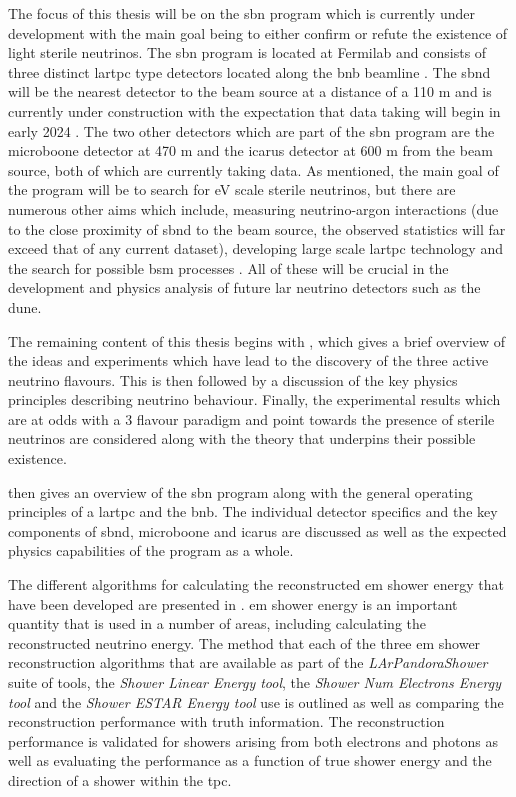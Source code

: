 The focus of this thesis will be on the \gls{sbn} program which is currently under development with the main goal being to either confirm or refute the existence of light sterile neutrinos. The \gls{sbn} program is located at Fermilab and consists of three distinct \gls{lartpc} type detectors located along the \gls{bnb} beamline \cite{SBN_Proposal}. The \gls{sbnd} will be the nearest detector to the beam source at a distance of a 110 m and is currently under construction with the expectation that data taking will begin in early 2024 \cite{sbnd_timeline}. The two other detectors which are part of the \gls{sbn} program are the \gls{microboone} detector at 470 m and the \gls{icarus} detector at 600 m from the beam source, both of which are currently taking data. As mentioned, the main goal of the program will be to search for eV scale sterile neutrinos, but there are numerous other aims which include, measuring neutrino-argon interactions (due to the close proximity of \gls{sbnd} to the beam source, the observed statistics will far exceed that of any current dataset), developing large scale \gls{lartpc} technology and the search for possible \gls{bsm} processes \cite{SBN_paper}. All of these will be crucial in the development and physics analysis of future \gls{lar} neutrino detectors such as the \gls{dune}. 

The remaining content of this thesis begins with , which gives a brief overview of the ideas and experiments which have lead to the discovery of the three active neutrino flavours. This is then followed by a discussion of the key physics principles describing neutrino behaviour. Finally, the experimental results which are at odds with a 3 flavour paradigm and point towards the presence of sterile neutrinos are considered along with the theory that underpins their possible existence. 

 then gives an overview of the \gls{sbn} program along with the general operating principles of a \gls{lartpc} and the \gls{bnb}. The individual detector specifics and the key components of \gls{sbnd}, \gls{microboone} and \gls{icarus} are discussed as well as the expected physics capabilities of the program as a whole. 

The different algorithms for calculating the reconstructed \gls{em} shower energy that have been developed are presented in . \gls{em} shower energy is an important quantity that is used in a number of areas, including calculating the reconstructed neutrino energy. The method that each of the three \gls{em} shower reconstruction algorithms that are available as part of the \textit{LArPandoraShower} suite of tools, the \textit{Shower Linear Energy tool}, the \textit{Shower Num Electrons Energy tool} and the \textit{Shower ESTAR Energy tool} use is outlined as well as comparing the reconstruction performance with truth information. The reconstruction performance is validated for showers arising from both electrons and photons as well as evaluating the performance as a function of true shower energy and the direction of a shower within the \gls{tpc}. 

